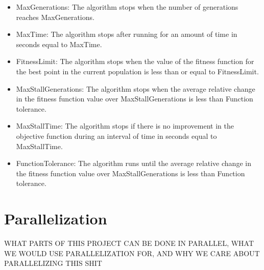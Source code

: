 \documentclass{article}
\renewcommand{\_}{\ifincsname_\else\legacyunderscore\fi}
\begin{document}
\begin{itemize}
    \item MaxGenerations: The algorithm stops when the number of generations reaches MaxGenerations.
    
    \item MaxTime: The algorithm stops after running for an amount of time in seconds equal to MaxTime.
    
    \item FitnessLimit: The algorithm stops when the value of the fitness function for the best point in the current population is less than or equal to FitnessLimit.
    
    \item MaxStallGenerations: The algorithm stops when the average relative change in the fitness function value over MaxStallGenerations is less than Function tolerance.
    
    \item MaxStallTime: The algorithm stops if there is no improvement in the objective function during an interval of time in seconds equal to MaxStallTime.
    
    \item FunctionTolerance: The algorithm runs until the average relative change in the fitness function value over MaxStallGenerations is less than Function tolerance.
\end{itemize}

\section*{Parallelization}
WHAT PARTS OF THIS PROJECT CAN BE DONE IN PARALLEL, WHAT WE WOULD USE PARALLELIZATION FOR, AND WHY WE CARE ABOUT PARALLELIZING THIS SHIT
\end{document}
